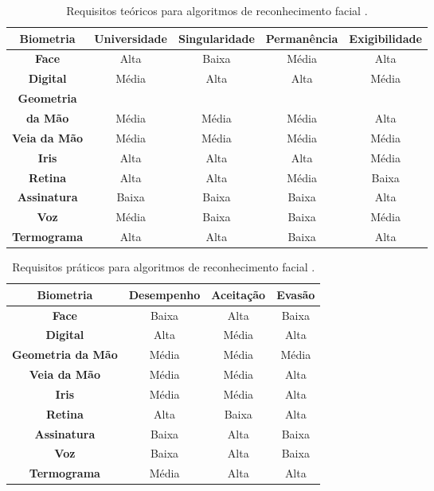 	\begin{table}[h]
		\begin{center}
			\caption{Requisitos teóricos para algoritmos de reconhecimento facial \cite{milene}.}
			\label{tab:tabelaRequisitosTeoricos}
			\begin{tabular}{|c|c|c|c|c|}
				\hline \bf Biometria & \bf Universidade & \bf Singularidade & \bf Permanência & \bf Exigibilidade \\
				\hline \hline \bf Face & Alta & Baixa & Média & Alta \\
				\hline \bf  Digital & Média & Alta & Alta & Média \\
				\hline \bf Geometria &&&&\\ \bf da Mão & Média & Média & Média & Alta \\
				\hline \bf Veia da Mão & Média & Média & Média & Média \\
				\hline \bf Iris & Alta & Alta & Alta & Média \\
				\hline \bf Retina & Alta & Alta & Média & Baixa \\
				\hline \bf Assinatura & Baixa & Baixa & Baixa & Alta\\
				\hline \bf Voz & Média & Baixa & Baixa & Média \\
				\hline \bf Termograma & Alta & Alta & Baixa & Alta \\
				\hline
			\end{tabular}
		\end{center}
	\end{table}

	\begin{table}[h]
		\begin{center}
			\caption{Requisitos práticos para algoritmos de reconhecimento facial \cite{milene}.}
			\label{tabelaRequisitosPraticos}
			\begin{tabular}{|c|c|c|c|}
				\hline \bf Biometria & \bf Desempenho & \bf Aceitação & \bf Evasão \\
				\hline \hline \bf Face & Baixa & Alta & Baixa\\
				\hline \bf Digital & Alta & Média &  Alta\\
				\hline \bf Geometria da Mão & Média & Média & Média\\
				\hline \bf Veia da Mão & Média & Média & Alta\\
				\hline \bf Iris  & Média & Média & Alta\\
				\hline \bf Retina & Alta & Baixa & Alta\\
				\hline \bf Assinatura & Baixa & Alta & Baixa \\
				\hline \bf Voz & Baixa & Alta & Baixa \\
				\hline \bf Termograma & Média & Alta & Alta \\
				\hline
			\end{tabular}
		\end{center}
	\end{table}

